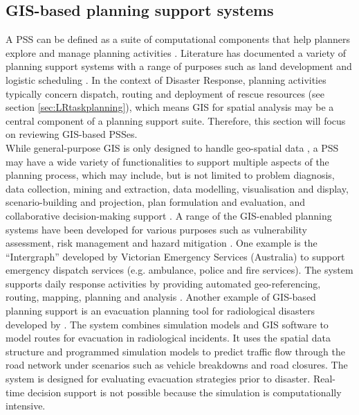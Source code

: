 \subsection{GIS-based planning support systems}
A \acf{PSS} can be defined as a suite of computational components that help planners explore and manage planning activities \citep{Geertman2004}. Literature has documented a variety of planning support systems with a range of purposes such as land development \citep{Pettit2003}  and logistic scheduling \citep{Miller}. In the context of Disaster Response, planning activities  typically concern dispatch, routing and deployment of rescue resources (see section \ref{sec:LRtaskplanning}), which means \ac{GIS} for spatial analysis may be a central component of a planning support suite. Therefore, this section will focus on reviewing \ac{GIS}-based \ac{PSS}es. \\

While general-purpose \ac{GIS} is only designed to handle geo-spatial data \citep{Geertman2004}, a \ac{PSS} may have a wide variety of functionalities to support multiple aspects of the planning process, which may include, but is not limited to problem diagnosis, data collection, mining and extraction, data modelling, visualisation and display, scenario-building and projection, plan formulation and evaluation, and collaborative decision-making support \citep{Geertman2004,Zerger2003}. A range of the \ac{GIS}-enabled planning systems have been developed for various purposes such as vulnerability assessment, risk management and hazard mitigation \citep{Cova1999,Schooley2010}. One example is the ``Intergraph'' developed by Victorian Emergency Services (Australia) \citep{IntergraphCorporation2000} to support emergency dispatch services (e.g. ambulance, police and fire services). The system supports daily response activities by providing automated geo-referencing, routing, mapping, planning and analysis \citep{Zerger2003}. Another example of \ac{GIS}-based planning support is an evacuation planning tool for radiological disasters developed by \citep{Eglese1994}. The system combines simulation models and  \ac{GIS} software to model routes for evacuation in radiological incidents.  It uses the spatial data structure and programmed simulation models to predict traffic flow through the road network under scenarios such as vehicle breakdowns and road closures. The system is designed for evaluating evacuation strategies prior to disaster. Real-time decision support is not possible because the simulation is computationally intensive.\\


